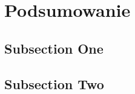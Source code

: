 \section{Podsumowanie}

\subsection{Subsection One}

\lipsum[7] %

\subsection{Subsection Two}

\lipsum[8] %
